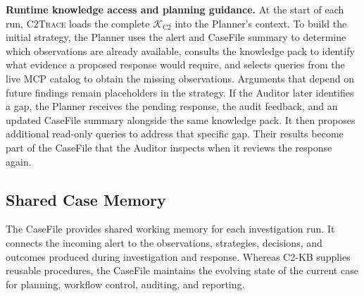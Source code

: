 \documentclass[pdflatex,sn-basic]{sn-jnl}
\newcommand{\system}{\textsc{C2Trace}\xspace}
\begin{document}
\noindent\textbf{Runtime knowledge access and planning guidance.} At the start of each run, \system loads the complete $\mathcal{K}_{\mathrm{C2}}$ into the Planner's context. To build the initial strategy, the Planner uses the alert and CaseFile summary to determine which observations are already available, consults the knowledge pack to identify what evidence a proposed response would require, and selects queries from the live MCP catalog to obtain the missing observations. Arguments that depend on future findings remain placeholders in the strategy. If the Auditor later identifies a gap, the Planner receives the pending response, the audit feedback, and an updated CaseFile summary alongside the same knowledge pack. It then proposes additional read-only queries to address that specific gap. Their results become part of the CaseFile that the Auditor inspects when it reviews the response again.

\subsection{Shared Case Memory}
\label{sec:shared-case-memory}

The CaseFile provides shared working memory for each investigation run. It connects the incoming alert to the observations, strategies, decisions, and outcomes produced during investigation and response. Whereas C2-KB supplies reusable procedures, the CaseFile maintains the evolving state of the current case for planning, workflow control, auditing, and reporting.
\end{document}

